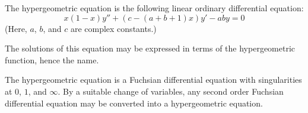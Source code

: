 \documentclass[12pt]{article}
\begin{document}
The hypergeometric equation is the following linear ordinary differential equation:
 $$x (1 - x) y'' + (c - (a + b + 1) x ) y' - aby = 0$$
(Here, $a$, $b$, and $c$ are complex constants.)

The solutions of this equation may be expressed in terms of the hypergeometric function, hence the name.

The hypergeometric equation is a Fuchsian differential equation with singularities at $0$, $1$, and $\infty$.  By a suitable change of variables, any second order Fuchsian differential equation may be converted into a hypergeometric equation.
\end{document}
